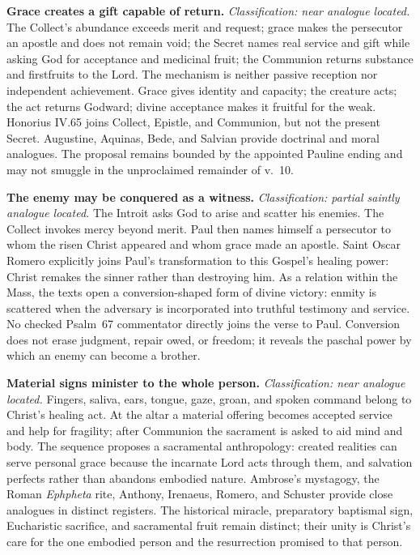 \noindent\textbf{Grace creates a gift capable of return.\enspace{}}
\emph{Classification: near analogue located.} The
Collect's abundance exceeds merit and request; grace makes the persecutor an
apostle and does not remain void; the Secret names real service and gift while
asking God for acceptance and medicinal fruit; the Communion returns substance
and firstfruits to the Lord. The mechanism is neither passive reception nor
independent achievement. Grace gives identity and capacity; the creature acts;
the act returns Godward; divine acceptance makes it fruitful for the weak.
Honorius IV.65 joins Collect, Epistle, and Communion, but not the present
Secret. Augustine, Aquinas, Bede, and Salvian provide
doctrinal and moral analogues. The proposal remains bounded by the appointed
Pauline ending and may not smuggle in the unproclaimed remainder of v.~10.

\noindent\textbf{The enemy may be conquered as a witness.\enspace{}}
\emph{Classification: partial saintly analogue located.} The Introit asks God
to arise and scatter his enemies. The Collect invokes mercy beyond merit. Paul
then names himself a persecutor to whom the risen Christ appeared and whom
grace made an apostle. Saint Oscar Romero explicitly joins Paul's transformation
to this Gospel's healing power: Christ remakes the sinner rather than
destroying him. As a relation within the Mass, the texts open a conversion-shaped
form of divine victory: enmity is scattered when the adversary is incorporated
into truthful testimony and service. No checked Psalm~67 commentator directly
joins the verse to Paul. Conversion does not erase judgment, repair owed, or
freedom; it reveals the paschal power by which an enemy can become a brother.

\noindent\textbf{Material signs minister to the whole person.\enspace{}}
\emph{Classification: near analogue located.} Fingers, saliva, ears, tongue,
gaze, groan, and spoken command belong to Christ's healing act. At the altar a
material offering becomes accepted service and help for fragility; after
Communion the sacrament is asked to aid mind and body. The sequence proposes a
sacramental anthropology: created realities can serve personal grace because
the incarnate Lord acts through them, and salvation perfects rather than
abandons embodied nature. Ambrose's mystagogy, the Roman \emph{Ephpheta} rite,
Anthony, Irenaeus, Romero, and Schuster provide close analogues in distinct
registers. The historical miracle, preparatory baptismal sign, Eucharistic
sacrifice, and sacramental fruit remain distinct; their unity is Christ's care
for the one embodied person and the resurrection promised to that person.

